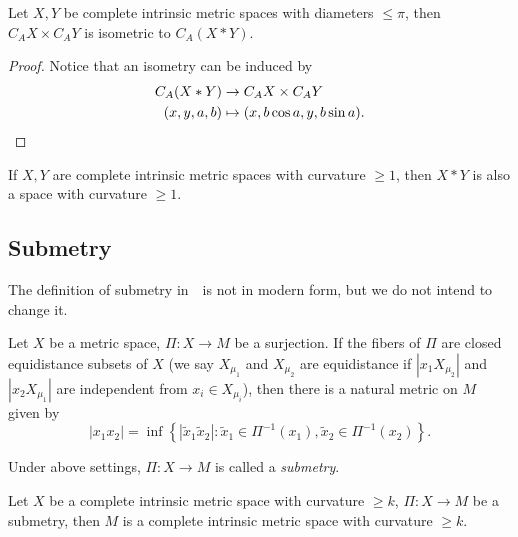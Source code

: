 \begin{prop}
    Let $X,Y$ be complete intrinsic metric spaces with diameters $\leq\pi$, then $C_AX\times C_AY$ is isometric to $C_A(X\ast Y)$.
\end{prop}
\begin{proof}
    Notice that an isometry can be induced by
    \begin{align*}
        C_A(X\ast Y)&\to C_AX\times C_AY\\
        (x,y,a,b)&\mapsto(x,b\cos{a},y,b\sin{a}).\qedhere
    \end{align*}
\end{proof}

\begin{cor}
    If $X,Y$ are complete intrinsic metric spaces with curvature $\geq 1$, then $X\ast Y$ is also a space with curvature $\geq 1$.
\end{cor}

\subsection{Submetry}

The definition of submetry in~\cite{buragoADAlexandrovSpaces1992}~is not in modern form, but we do not intend to change it.

\begin{lem}
    Let $X$ be a metric space, $\Pi:X\to M$ be a surjection.
    If the fibers of $\Pi$ are closed equidistance subsets of $X$ (we say $X_{\mu_1}$ and $X_{\mu_2}$ are equidistance if $|x_1X_{\mu_2}|$ and $|x_2X_{\mu_1}|$ are independent from $x_i\in X_{\mu_i}$), then there is a natural metric on $M$ given by
    \[|x_1x_2|=\inf\left\{|\tilde{x}_1\tilde{x}_2|\colon\tilde{x}_1\in\Pi^{-1}(x_1),\tilde{x}_2\in\Pi^{-1}(x_2)\right\}.\]
\end{lem}

\begin{defn}
    Under above settings, $\Pi:X\to M$ is called a \emph{submetry}.
\end{defn}

\begin{prop}\label{prop:submetry}
    Let $X$ be a complete intrinsic metric space with curvature $\geq k$, $\Pi:X\to M$ be a submetry, then $M$ is a complete intrinsic metric space with curvature $\geq k$.
\end{prop}

